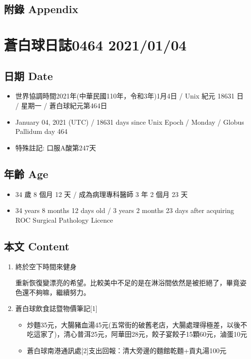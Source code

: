 \documentclass[
]{article}
\providecommand{\tightlist}{%
  \setlength{\itemsep}{0pt}\setlength{\parskip}{0pt}}
\begin{document}
\hypertarget{ux9644ux9304-appendix-2}{%
\subsection{附錄 Appendix}\label{ux9644ux9304-appendix-2}}

\hypertarget{ux84bcux767dux7403ux65e5ux8a8c0464-20210104}{%
\section{蒼白球日誌0464
2021/01/04}\label{ux84bcux767dux7403ux65e5ux8a8c0464-20210104}}

\hypertarget{ux65e5ux671f-date-3}{%
\subsection{日期 Date}\label{ux65e5ux671f-date-3}}

\begin{itemize}
\tightlist
\item
  世界協調時間2021年(中華民國110年，令和3年)1月4日 / Unix 紀元 18631 日
  / 星期一 / 蒼白球紀元第464日
\item
  January 04, 2021 (UTC) / 18631 days since Unix Epoch / Monday / Globus
  Pallidum day 464
\item
  特殊註記: 口服A酸第247天
\end{itemize}

\hypertarget{ux5e74ux9f61-age-3}{%
\subsection{年齡 Age}\label{ux5e74ux9f61-age-3}}

\begin{itemize}
\tightlist
\item
  34 歲 8 個月 12 天 / 成為病理專科醫師 3 年 2 個月 23 天
\item
  34 years 8 months 12 days old / 3 years 2 months 23 days after
  acquiring ROC Surgical Pathology Licence
\end{itemize}

\hypertarget{ux672cux6587-content-3}{%
\subsection{本文 Content}\label{ux672cux6587-content-3}}

\begin{enumerate}
\def\labelenumi{\arabic{enumi}.}
\item
  終於空下時間來健身

  重新恢復變漂亮的希望。比較美中不足的是在淋浴間依然是被拒絕了，畢竟姿色還不夠嘛，繼續努力。
\item
  蒼白球飲食誌暨物價筆記{[}1{]}

  \begin{itemize}
  \tightlist
  \item
    炒麵35元，大腸豬血湯45元(五常街的破舊老店，大腸處理得極差，以後不吃這家了)，清心普洱25元，阿華田28元，餃子宴餃子15顆60元，滷蛋10元
  \item
    蒼白球南港通訊處{[}2{]}支出回報：清大旁邊的麵館乾麵+貢丸湯100元
  \end{itemize}
\end{enumerate}
\end{document}
